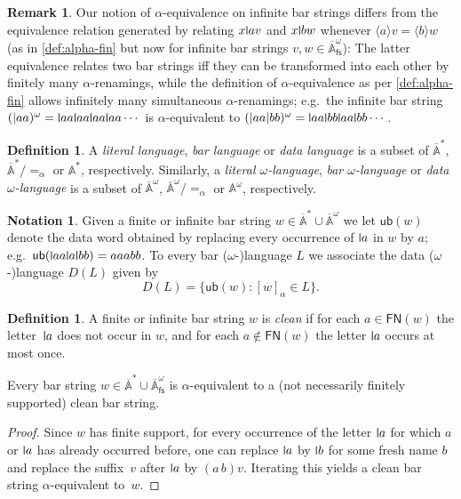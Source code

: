 \documentclass[final,a4paper,UKenglish,thm-restate,autoref,numberwithinsect]{lipics-v2021}
\newcommand{\midmid}{\hspace{0.2ex}{\rule[-0.1ex]{0.6pt}{1.65ex}}\hspace{0.2ex}}
\newcommand{\compr}{:}
\newcommand{\newletter}[1]{{\midmid}#1}
\newcommand{\free}[1]{\mathsf{FN}(#1)}
\newcommand{\barA}{\overline{\names}}
\newcommand{\ub}{\mathsf{ub}}
\numberwithin{equation}{section}
\newcommand{\braket}[1]{\langle #1 \rangle}
\newcommand{\fs}{\mathsf{fs}}
\newcommand{\+}[1]{\mathcal{#1}\xspace}
\newcommand{\names}{\mathbb{A}}
\theoremstyle{definition}
\newtheorem{defn}[theorem]{Definition}
\newtheorem{rem}[theorem]{Remark}
\newtheorem{nota}[theorem]{Notation}
\begin{document}
\begin{rem}
  Our notion of $\alpha$-equivalence on infinite bar strings differs
  from the equivalence relation generated by relating $x\newletter av$
  and $x\newletter bw$ whenever $\braket{a} v = \braket{b} w$ (as in
  \autoref{def:alpha-fin} but now for infinite bar strings
  $v,w\in \barA^\omega_\fs$): The latter equivalence relates two bar
  strings iff they can be transformed into each other by finitely many
  $\alpha$-renamings, while the definition of $\alpha$-equivalence as
  per \autoref{def:alpha-fin} allows infinitely many simultaneous
  $\alpha$-renamings; e.g.~the infinite bar string
  $(|aa)^\omega= \newletter aa \newletter aa\newletter aa\newletter aa
  \cdots$ is $\alpha$-equivalent to
  $(|aa|bb)^\omega = \newletter aa \newletter bb\newletter aa
  \newletter bb\cdots$.
\end{rem}
%
%

\begin{defn}
  A \emph{literal language}, \emph{bar language} or \emph{data
    language} is a subset of $\barA^*$, $\barA^*/{=_\alpha}$ or
  $\names^*$, respectively.  Similarly, a \emph{literal
    $\omega$-language}, \emph{bar $\omega$-language} or \emph{data
    $\omega$-language} is a subset of $\barA^\omega$,
  $\barA^\omega/{=_\alpha}$ or $\names^\omega$, respectively.
\end{defn}
%
\begin{nota}\label{not:local-semantics}
  Given a finite or infinite bar string
  $w\in \barA^*\cup \barA^\omega$ we let $\ub(w)$ denote the data word
  obtained by replacing every occurrence of $\newletter a$ in $w$ by $a$; e.g.\
  $\ub(\newletter aa\newletter a\newletter bb)=aaabb$. To every bar ($\omega$-)language $L$ we associate the data
  ($\omega$-)language $D(L)$ given by
  \[
    D(L) = \{ \ub(w) \compr [w]_\alpha \in L \}.
  \]
\end{nota}
%
\begin{defn}\label{D:clean}
  A finite or infinite bar string $w$ is \emph{clean} if for each
  $a\in \free{w}$ the letter~$\newletter a$ does not occur in $w$, and for each
  $a\not\in \free{w}$ the letter $\newletter a$ occurs at most once.
\end{defn}
%
\begin{lemma}\label{lem:clean}
  Every bar string $w\in \barA^*\cup \barA^\omega_\fs$ is $\alpha$-equivalent to a (not necessarily finitely supported) clean bar string.
\end{lemma}
%
\begin{proof}
  Since $w$ has finite support, for every occurrence of the letter
  $\newletter a$ for which $a$ or $\newletter a$ has already occurred before, one can
  replace $\newletter a$ by $\newletter b$ for some fresh name $b$ and replace the
  suffix~$v$ after $\newletter a$ by $(a\, b)v$. Iterating this %
  yields a clean bar string $\alpha$-equivalent to~$w$.
\end{proof}
\end{document}
